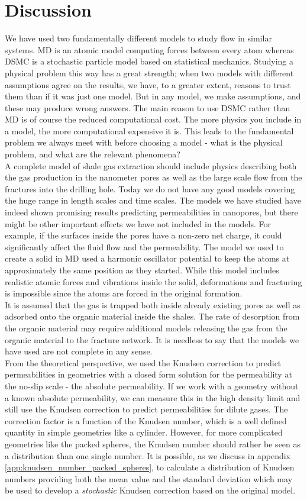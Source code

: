 \section{Discussion}
We have used two fundamentally different models to study flow in similar systems. MD is an atomic model computing forces between every atom whereas DSMC is a stochastic particle model based on statistical mechanics. Studying a physical problem this way has a great strength; when two models with different assumptions agree on the results, we have, to a greater extent, reasons to trust them than if it was just one model. But in any model, we make assumptions, and these may produce wrong answers. The main reason to use DSMC rather than MD is of course the reduced computational cost. The more physics you include in a model, the more computational expensive it is. This leads to the fundamental problem we always meet with before choosing a model - what is the physical problem, and what are the relevant phenomena?\\
A complete model of shale gas extraction should include physics describing both the gas production in the nanometer pores as well as the large scale flow from the fractures into the drilling hole. Today we do not have any good models covering the huge range in length scales and time scales. The models we have studied have indeed shown promising results predicting permeabilities in nanopores, but there might be other important effects we have not included in the models. For example, if the surfaces inside the pores have a non-zero net charge, it could significantly affect the fluid flow and the permeability. The model we used to create a solid in MD used a harmonic oscillator potential to keep the atoms at approximately the same position as they started. While this model includes realistic atomic forces and vibrations inside the solid, deformations and fracturing is impossible since the atoms are forced in the original formation.\\
It is assumed that the gas is trapped both inside already existing pores as well as adsorbed onto the organic material inside the shales. The rate of desorption from the organic material may require additional models releasing the gas from the organic material to the fracture network. It is needless to say that the models we have used are not complete in any sense. \\
From the theoretical perspective, we used the Knudsen correction to predict permeabilities in geometries with a closed form solution for the permeability at the no-slip scale - the absolute permeability. If we work with a geometry without a known absolute permeability, we can measure this in the high density limit and still use the Knudsen correction to predict permeabilities for dilute gases. The correction factor is a function of the Knudsen number, which is a well defined quantity in simple geometries like a cylinder. However, for more complicated geometries like the packed spheres, the Knudsen number should rather be seen as a distribution than one single number. It is possible, as we discuss in appendix \ref{app:knudsen_number_packed_spheres}, to calculate a distribution of Knudsen numbers providing both the mean value and the standard deviation which may be used to develop a \textit{stochastic} Knudsen correction based on the original model. 